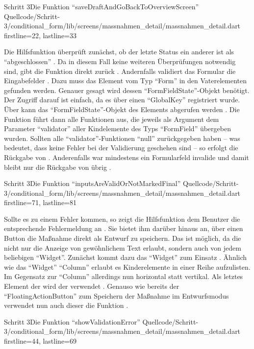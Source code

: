 \begin{alexlisting}{Schritt 3}{Die Funktion \enquote{saveDraftAndGoBackToOverviewScreen}}
    {Quellcode/Schritt-3/conditional_form/lib/screens/massnahmen_detail/massnahmen_detail.dart}
    {firstline=22, lastline=33}
    \label{lst:Schritt3saveDraftAndGoBackToOverviewScreen}
\end{alexlisting}

\clearpage
Die Hilfsfunktion  überprüft zunächst, ob der letzte Status ein anderer ist als \enquote{abgeschlossen} .
Da in diesem Fall keine weiteren Überprüfungen notwendig sind, gibt die Funktion direkt  zurück .
Andernfalls validiert das Formular die Eingabefelder .
Dazu muss das Element vom Typ \enquote{Form} in den Vaterelementen gefunden werden.
Genauer gesagt wird dessen \enquote{FormFieldState}-Objekt benötigt.
Der Zugriff darauf ist einfach, da es über einen \enquote{GlobalKey} registriert wurde.
Über  kann das \enquote{FormFieldState}-Objekt des Elements abgerufen werden .
Die Funktion  führt dann alle Funktionen aus, die jeweils als Argument dem Parameter \enquote{validator} aller Kindelemente des Typs \enquote{FormField} übergeben wurden.
Sollten alle \enquote{validator}-Funktionen \enquote{null} zurückgegeben haben -- was bedeutet, dass keine Fehler bei der Validierung geschehen sind -- so erfolgt die Rückgabe von  .
Anderenfalls war mindestens ein Formularfeld invalide und damit bleibt nur die Rückgabe von  übrig . 

\begin{alexlisting}{Schritt 3}{Die Funktion \enquote{inputsAreValidOrNotMarkedFinal}}
    {Quellcode/Schritt-3/conditional_form/lib/screens/massnahmen_detail/massnahmen_detail.dart}
    {firstline=71, lastline=81}
    \label{lst:Schritt3inputsAreValidOrNotMarkedFinal}
\end{alexlisting}

Sollte es zu einem Fehler kommen, so zeigt die Hilfsfunktion  dem Benutzer die entsprechende Fehlermeldung an \Lst{\ref{lst:Schritt3showValidationError}}.
Sie bietet ihm darüber hinaus an, über einen Button die Maßnahme direkt als Entwurf zu speichern.
Das ist möglich, da die   nicht nur die Anzeige von gewöhnlichem Text erlaubt, sondern auch von jedem beliebigen \enquote{Widget}.
Zunächst kommt dazu das \enquote{Widget}  zum Einsatz .
Ähnlich wie das \enquote{Widget} \enquote{Column} erlaubt es Kinderelemente in einer Reihe aufzulisten.
Im Gegensatz zur \enquote{Column} allerdings nun horizontal statt vertikal.
Als letztes Element der  wird der   verwendet .
Genauso wie bereits der \enquote{FloatingActionButton} zum Speichern der Maßnahme im Entwurfsmodus verwendet nun auch dieser  die Funktion  .

\begin{alexlisting}{Schritt 3}{Die Funktion \enquote{showValidationError}}
    {Quellcode/Schritt-3/conditional_form/lib/screens/massnahmen_detail/massnahmen_detail.dart}
    {firstline=44, lastline=69}
    \label{lst:Schritt3showValidationError}
\end{alexlisting}
